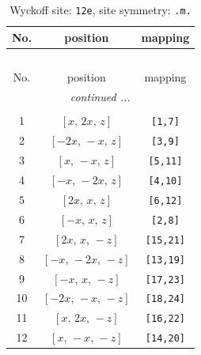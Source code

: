 \documentclass[fleqn,8pt]{jsarticle}
\begin{document}
\begin{longtable}{ccc}
\caption{Wyckoff site: {\tt 12e}, site symmetry: {\tt .m.}}
 \\
 \hline \hline
No. & position & mapping \\ \hline \endfirsthead

\multicolumn{2}{l}{\tablename\ \thetable{}} \\
 \hline \hline
No. & position & mapping \\ \hline \endhead

 \hline \hline
\multicolumn{2}{r}{\footnotesize\it continued ...} \\ \endfoot

 \hline \hline
\multicolumn{2}{r}{} \\ \endlastfoot

1 & $\left[ x,\, 2 x,\, z \right]$ & {\tt [1,7]} \\ \hline
2 & $\left[ - 2 x,\, - x,\, z \right]$ & {\tt [3,9]} \\ \hline
3 & $\left[ x,\, - x,\, z \right]$ & {\tt [5,11]} \\ \hline
4 & $\left[ - x,\, - 2 x,\, z \right]$ & {\tt [4,10]} \\ \hline
5 & $\left[ 2 x,\, x,\, z \right]$ & {\tt [6,12]} \\ \hline
6 & $\left[ - x,\, x,\, z \right]$ & {\tt [2,8]} \\ \hline
7 & $\left[ 2 x,\, x,\, - z \right]$ & {\tt [15,21]} \\ \hline
8 & $\left[ - x,\, - 2 x,\, - z \right]$ & {\tt [13,19]} \\ \hline
9 & $\left[ - x,\, x,\, - z \right]$ & {\tt [17,23]} \\ \hline
10 & $\left[ - 2 x,\, - x,\, - z \right]$ & {\tt [18,24]} \\ \hline
11 & $\left[ x,\, 2 x,\, - z \right]$ & {\tt [16,22]} \\ \hline
12 & $\left[ x,\, - x,\, - z \right]$ & {\tt [14,20]} \\
\end{longtable}
\renewcommand{\arraystretch}{1.2}
\end{document}
